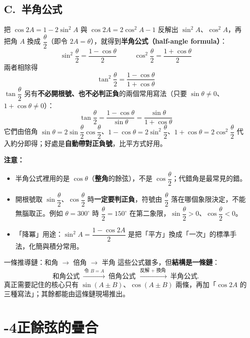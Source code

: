 \documentclass[11pt]{article}
\begin{document}
\subsection*{\sffamily C.\ 半角公式}

把 $\cos2A=1-2\sin^2A$ 與 $\cos2A=2\cos^2A-1$ 反解出 $\sin^2A$、$\cos^2A$，再把角 $A$ 換成 $\dfrac{\theta}{2}$（即令 $2A=\theta$），就得到\textbf{半角公式（half-angle formula）}：
$$\boxed{\;\sin^2\frac{\theta}{2}=\frac{1-\cos\theta}{2}\;}\qquad\boxed{\;\cos^2\frac{\theta}{2}=\frac{1+\cos\theta}{2}\;}$$
兩者相除得
$$\boxed{\;\tan^2\frac{\theta}{2}=\frac{1-\cos\theta}{1+\cos\theta}\;}$$
$\tan\dfrac{\theta}{2}$ 另有\textbf{不必開根號、也不必判正負}的兩個常用寫法（只要 $\sin\theta\neq0$、$1+\cos\theta\neq0$）：
$$\boxed{\;\tan\frac{\theta}{2}=\frac{1-\cos\theta}{\sin\theta}=\frac{\sin\theta}{1+\cos\theta}\;}$$
它們由倍角 $\sin\theta=2\sin\dfrac{\theta}{2}\cos\dfrac{\theta}{2}$、$1-\cos\theta=2\sin^2\dfrac{\theta}{2}$、$1+\cos\theta=2\cos^2\dfrac{\theta}{2}$ 代入約分即得；好處是\textbf{自動帶對正負號}，比平方式好用。

\textbf{注意：}
\begin{itemize}\setlength{\itemsep}{1pt}
\item 半角公式裡用的是 $\cos\theta$（\textbf{整角}的餘弦），不是 $\cos\dfrac{\theta}{2}$；代錯角是最常見的錯。
\item 開根號取 $\sin\dfrac{\theta}{2}$、$\cos\dfrac{\theta}{2}$ 時\textbf{一定要判正負}，符號由 $\dfrac{\theta}{2}$ 落在哪個象限決定，不能無腦取正。例如 $\theta=300^\circ$ 時 $\dfrac{\theta}{2}=150^\circ$ 在第二象限，$\sin\dfrac{\theta}{2}>0$、$\cos\dfrac{\theta}{2}<0$。
\item 「降冪」用途：$\sin^2A=\dfrac{1-\cos2A}{2}$ 是把「平方」換成「一次」的標準手法，化簡與積分常用。
\end{itemize}

\begin{補充框}{一條推導鏈：和角 $\rightarrow$ 倍角 $\rightarrow$ 半角}
這些公式雖多，但\textbf{結構是一條鏈}：
$$\text{和角公式}\ \xrightarrow{\ \text{令 } B=A\ }\ \text{倍角公式}\ \xrightarrow{\ \text{反解 }+\text{ 換角}\ }\ \text{半角公式}.$$
真正需要記住的核心只有 $\sin(A\pm B)$、$\cos(A\pm B)$ 兩條，再加「$\cos2A$ 的三種寫法」；其餘都能由這條鏈現場推出。
\end{補充框}

\section*{-4\quad 正餘弦的疊合}
\end{document}
